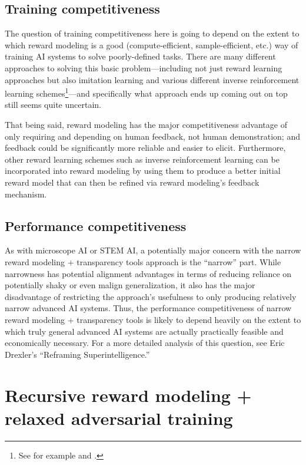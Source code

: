 \documentclass[
  onecolumn,
  natbib,
]{miri-tech-article}
\begin{document}
\subsection{Training competitiveness} The question of training competitiveness here is going to depend on the extent to which reward modeling is a good (compute-efficient, sample-efficient, etc.) way of training AI systems to solve poorly-defined tasks. There are many different approaches to solving this basic problem---including not just reward learning approaches but also imitation learning and various different inverse reinforcement learning schemes\footnote{See for example \cite{generative} and \cite{learning_robust_rewards}.}---and specifically what approach ends up coming out on top still seems quite uncertain.

That being said, reward modeling has the major competitiveness advantage of only requiring and depending on human feedback, not human demonstration; and feedback could be significantly more reliable and easier to elicit. Furthermore, other reward learning schemes such as inverse reinforcement learning can be incorporated into reward modeling by using them to produce a better initial reward model that can then be refined via reward modeling's feedback mechanism.

\subsection{Performance competitiveness} As with microscope AI or STEM AI, a potentially major concern with the narrow reward modeling + transparency tools approach is the ``narrow'' part. While narrowness has potential alignment advantages in terms of reducing reliance on potentially shaky or even malign generalization, it also has the major disadvantage of restricting the approach's usefulness to only producing relatively narrow advanced AI systems. Thus, the performance competitiveness of narrow reward modeling + transparency tools is likely to depend heavily on the extent to which truly general advanced AI systems are actually practically feasible and economically necessary. For a more detailed analysis of this question, see Eric Drexler's ``Reframing Superintelligence.''\cite{reframing_si}

\section{Recursive reward modeling + relaxed adversarial training}
\label{sec:8}
\end{document}
